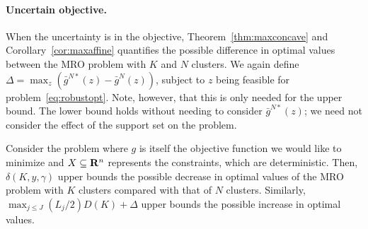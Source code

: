 {{\paragraph{Uncertain objective.}%
\label{par:uncertain_objective_max}
When the uncertainty is in the objective, Theorem~\ref{thm:maxconcave} and Corollary~\ref{cor:maxaffine} quantifies the possible difference in optimal values between the \gls{MRO} problem with $K$ and $N$ clusters. We again define ${\Delta = \max_{z}\left(\bar{g}^{N*}(z) - \bar{g}^{N}(z)\right)}$, subject to $z$ being feasible for problem~\eqref{eq:robustopt}. 
Note, however, that this is only needed for the upper bound. The lower bound holds without needing to consider $\bar{g}^{N*}(z)$; we need not consider the effect of the support set on the problem.
\begin{corollary}
	\label{cor:obj_unc_max}
Consider the problem where $g$ is itself the objective function we would like to minimize and $X \subseteq {\mathbf R}^n$ represents the constraints, which are deterministic.
Then, $\delta(K,y,\gamma)$ upper bounds the possible decrease in optimal values of the \gls{MRO} problem with $K$ clusters compared with that of $N$ clusters. 
Similarly, $\max_{j\leq J}(L_j/2)D(K) + \Delta$ upper bounds the possible increase in optimal values.
\end{corollary}}
\reviewChanges{
}}
